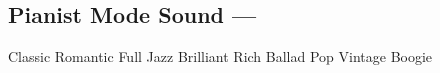 \subsection[Pianist Mode Sound]{Pianist Mode Sound --- \UiKey{\I}\UiKey{\SND}}
Classic
Romantic
Full
Jazz
Brilliant
Rich
Ballad
Pop
Vintage
Boogie
